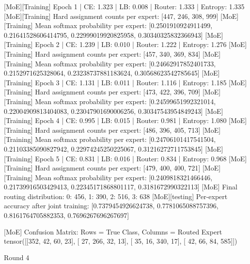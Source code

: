[MoE][Training] Epoch 1 | CE: 1.323 | LB: 0.008 | Router: 1.333 | Entropy: 1.335
[MoE][Training] Hard assignment counts per expert: [447, 246, 308, 999]
[MoE][Training] Mean softmax probability per expert: [0.2501910924911499, 0.21641528606414795, 0.22999019920825958, 0.30340325832366943]
[MoE][Training] Epoch 2 | CE: 1.239 | LB: 0.010 | Router: 1.222 | Entropy: 1.276
[MoE][Training] Hard assignment counts per expert: [457, 340, 369, 834]
[MoE][Training] Mean softmax probability per expert: [0.24662917852401733, 0.2152971625328064, 0.23238737881183624, 0.30568623542785645]
[MoE][Training] Epoch 3 | CE: 1.131 | LB: 0.011 | Router: 1.116 | Entropy: 1.185
[MoE][Training] Hard assignment counts per expert: [473, 422, 396, 709]
[MoE][Training] Mean softmax probability per expert: [0.24599651992321014, 0.22004909813404083, 0.23047901690006256, 0.30347543954849243]
[MoE][Training] Epoch 4 | CE: 0.995 | LB: 0.015 | Router: 0.981 | Entropy: 1.080
[MoE][Training] Hard assignment counts per expert: [486, 396, 405, 713]
[MoE][Training] Mean softmax probability per expert: [0.24706101417541504, 0.21103385090827942, 0.22974245250225067, 0.31216272711753845]
[MoE][Training] Epoch 5 | CE: 0.831 | LB: 0.016 | Router: 0.834 | Entropy: 0.968
[MoE][Training] Hard assignment counts per expert: [479, 400, 400, 721]
[MoE][Training] Mean softmax probability per expert: [0.2409818321466446, 0.21739916503429413, 0.22345171868801117, 0.3181672990322113]
[MoE] Final routing distribution: {0: 456, 1: 390, 2: 516, 3: 638}
[MoE][testing] Per-expert accuracy after joint training: [0.7379454926624738, 0.7781065088757396, 0.8161764705882353, 0.7696267696267697]

[MoE] Confusion Matrix: Rows = True Class, Columns = Routed Expert
tensor([[352,  42,  60,  23],
[ 27, 266,  32,  13],
[ 35,  16, 340,  17],
[ 42,  66,  84, 585]])

Round 4

